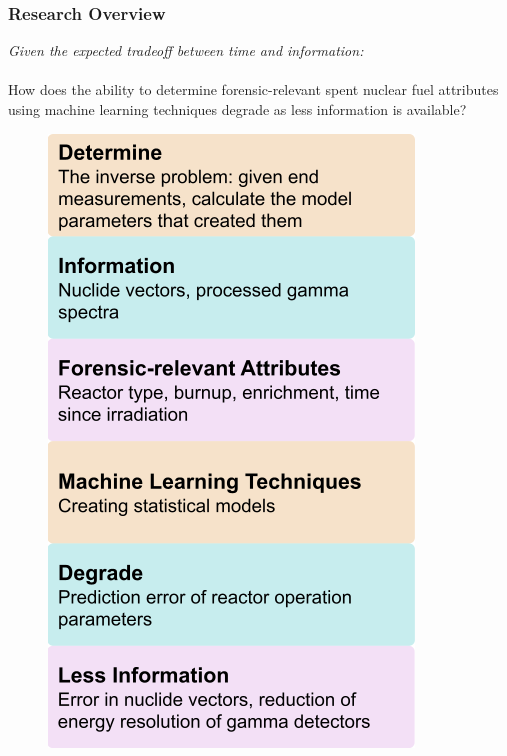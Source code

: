
\begin{frame}
  \frametitle{Research Overview}
  \begin{minipage}{0.58\textwidth}
    \textit{Given the expected tradeoff between time and information:} \\~\\
    How does the ability to determine forensic-relevant spent nuclear fuel
    attributes using machine learning techniques degrade as less information is
    available?
  \end{minipage}%
  \hfill
  \begin{minipage}{0.38\textwidth}
    \begin{figure}
      \centering
      \includegraphics[height=0.85\textheight]{./figures/overview.png}
    \end{figure}
  \end{minipage}
\end{frame}

